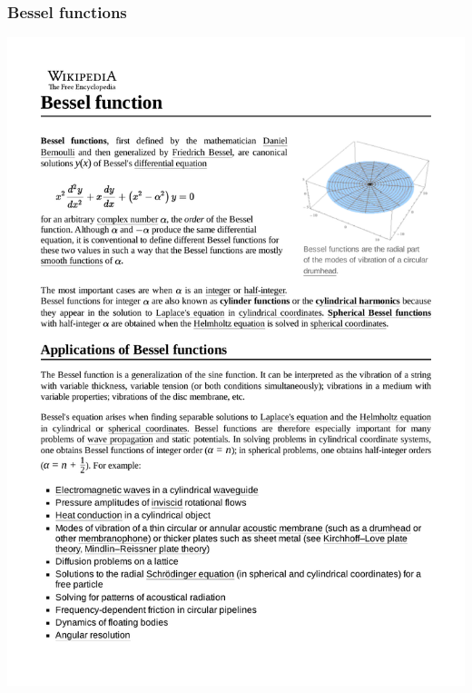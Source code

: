 \documentclass{beamer}
\begin{document}
\begin{frame}[fragile]
\frametitle{Bessel functions}
\includegraphics[page=7, clip, trim=0in 0in 0in 0in, width=\textwidth]{Bessel function.pdf}
\end{frame}
\end{document}
